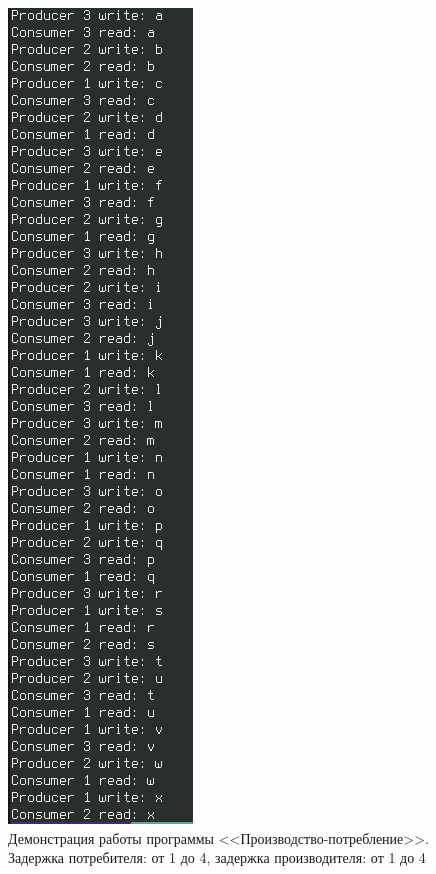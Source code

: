 \documentclass[12pt]{report}
\begin{document}
\begin{figure}[H]
	\centering
	\includegraphics[scale=0.6]{img/prod-cons-01.png}
	\caption{Демонстрация работы программы <<Производство-потребление>>. Задержка потребителя: от 1 до 4, задержка производителя: от 1 до 4}
	\label{fig:task01-01}
\end{figure}
\end{document}
